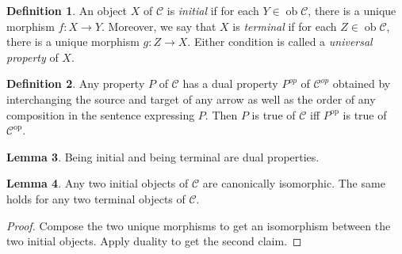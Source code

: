 \documentclass[10pt,letterpaper,cm]{nupset}
\theoremstyle{definition}
\newtheorem{definition}{Definition}
\theoremstyle{theorem}
\newtheorem{lemma}[definition]{Lemma}
\theoremstyle{remark}
\newcommand{\1}{\mathbf{1}}
\renewcommand{\c}{\mathscr{C}}
\newcommand{\0}{\vec 0}
\DeclareMathOperator{\op}{op}
\DeclareMathOperator{\ob}{ob}
\begin{document}
\begin{abstract}
Even more basic category theory. The main sources for this talk are the following.
\begin{itemize}
\item \textit{nLab}.
\item John Rognes's \textit{Lecture Notes on Algebraic K-Theory}, Ch. 4.
\item Peter Johnstone's lecture notes for ``Category Theory" (Mathematical Tripos Part III, Michaelmas 2015), Ch. 4.
\end{itemize}
\end{abstract}

\begin{definition}
An object $X$ of $\c$ is \textit{initial} if for each $Y \in \ob \c$, there is a unique morphism $f : X \to Y$. Moreover, we say that $X$ is \textit{terminal} if for each $Z \in \ob \c$, there is a unique morphism $g : Z \to X$. Either condition is called a \textit{universal property} of $X$.
\end{definition}

\begin{definition}
Any property $P$ of $\c$ has a dual property $P^{op}$ of $\c^{op}$ obtained by interchanging the source and target of any arrow as well as the order of any composition in the sentence expressing $P$. Then $P$ is true of $\c$ iff $P^{\op}$ is true of $\c^{\op}$.
\end{definition}

\begin{lemma}
Being initial and being terminal are dual properties.
\end{lemma}

\begin{lemma}\label{initial}
Any two initial objects of $\c$ are canonically isomorphic. The same holds for any two terminal objects of $\c$.
\end{lemma}
\begin{proof}
Compose the two unique morphisms to get an isomorphism between the two initial objects. Apply duality to get the second claim.
\end{proof}
\end{document}
